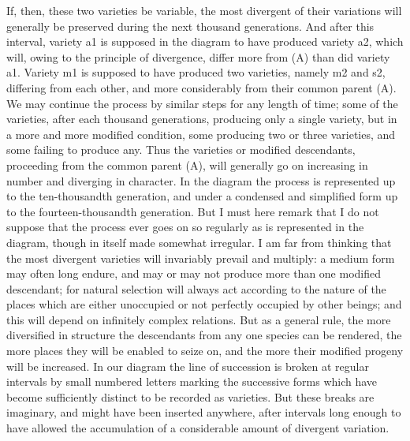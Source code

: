 If, then, these two varieties be variable, the most divergent of their variations will generally be preserved during the next thousand generations. And after this interval, variety a1 is supposed in the diagram to have produced variety a2, which will, owing to the principle of divergence, differ more from (A) than did variety a1. Variety m1 is supposed to have produced two varieties, namely m2 and s2, differing from each other, and more considerably from their common parent (A). We may continue the process by similar steps for any length of time; some of the varieties, after each thousand generations, producing only a single variety, but in a more and more modified condition, some producing two or three varieties, and some failing to produce any. Thus the varieties or modified descendants, proceeding from the common parent (A), will generally go on increasing in number and diverging in character. In the diagram the process is represented up to the ten-thousandth generation, and under a condensed and simplified form up to the fourteen-thousandth generation.
But I must here remark that I do not suppose that the process ever goes on so regularly as is represented in the diagram, though in itself made somewhat irregular. I am far from thinking that the most divergent varieties will invariably prevail and multiply: a medium form may often long endure, and may or may not produce more than one modified descendant; for natural selection will always act according to the nature of the places which are either unoccupied or not perfectly occupied by other beings; and this will depend on infinitely complex relations. But as a general rule, the more diversified in structure the descendants from any one species can be rendered, the more places they will be enabled to seize on, and the more their modified progeny will be increased. In our diagram the line of succession is broken at regular intervals by small numbered letters marking the successive forms which have become sufficiently distinct to be recorded as varieties. But these breaks are imaginary, and might have been inserted anywhere, after intervals long enough to have allowed the accumulation of a considerable amount of divergent variation.
